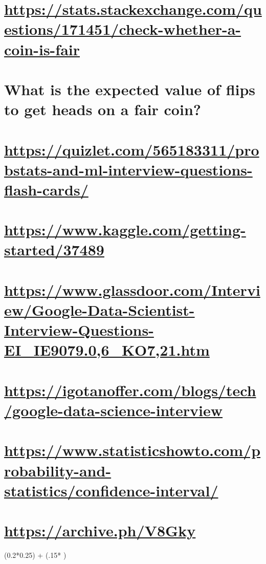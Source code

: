 \documentclass[11pt]{article}
\begin{document}
\section{\url{https://stats.stackexchange.com/questions/171451/check-whether-a-coin-is-fair}}
\label{sec:org95bdb29}
\section{What is the expected value of flips to get heads on a fair coin?}
\label{sec:orgac9681b}
\section{\url{https://quizlet.com/565183311/probstats-and-ml-interview-questions-flash-cards/}}
\label{sec:org68a803d}
\section{\url{https://www.kaggle.com/getting-started/37489}}
\label{sec:org4b7c64b}
\section{\url{https://www.glassdoor.com/Interview/Google-Data-Scientist-Interview-Questions-EI\_IE9079.0,6\_KO7,21.htm}}
\label{sec:org0581453}
\section{\url{https://igotanoffer.com/blogs/tech/google-data-science-interview}}
\label{sec:org4824888}
\section{\url{https://www.statisticshowto.com/probability-and-statistics/confidence-interval/}}
\label{sec:orgfbbbbe1}
\section{\url{https://archive.ph/V8Gky}}
\label{sec:org9ff0a60}



(0.2*0.25) + (.15* )
\end{document}
